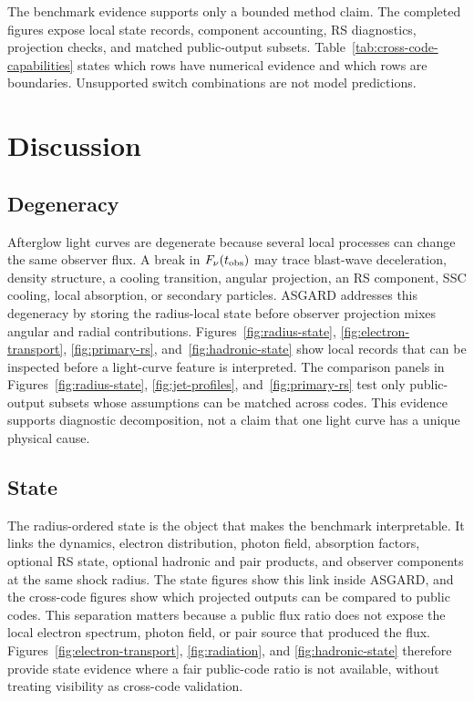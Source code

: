 \documentclass[twocolumn]{aastex702}
\begin{document}
The benchmark evidence supports only a bounded method claim.  The completed
figures expose local state records, component accounting, RS diagnostics,
projection checks, and matched public-output subsets.
Table~\ref{tab:cross-code-capabilities} states which rows have
numerical evidence and which rows are boundaries.  Unsupported switch
combinations are not model predictions.

\section{Discussion} \label{sec:discussion}

\subsection{Degeneracy}

Afterglow light curves are degenerate because several local processes can change
the same observer flux.  A break in \(F_\nu(t_{\rm obs})\) may trace blast-wave
deceleration, density structure, a cooling transition, angular projection, an RS
component, SSC cooling, local absorption, or secondary particles.  ASGARD
addresses this degeneracy by storing the radius-local state before observer
projection mixes angular and radial contributions.  Figures~\ref{fig:radius-state},
\ref{fig:electron-transport}, \ref{fig:primary-rs}, and~\ref{fig:hadronic-state}
show local records that can be inspected before a light-curve feature is
interpreted.  The comparison panels in Figures~\ref{fig:radius-state},
\ref{fig:jet-profiles}, and~\ref{fig:primary-rs} test only public-output subsets
whose assumptions can be matched across codes.
This evidence supports diagnostic decomposition, not a claim that one light curve
has a unique physical cause.

\subsection{State}

The radius-ordered state is the object that makes the benchmark interpretable.
It links the dynamics, electron distribution, photon field, absorption factors,
optional RS state, optional hadronic and pair products, and observer components
at the same shock radius.  The state figures show this link inside ASGARD, and
the cross-code figures show which projected outputs can be compared to public
codes.  This separation matters because a public flux ratio does not expose the
local electron spectrum, photon field, or pair source that produced the flux.
Figures~\ref{fig:electron-transport}, \ref{fig:radiation}, and
\ref{fig:hadronic-state} therefore provide state evidence where a fair
public-code ratio is not available, without treating visibility as cross-code
validation.
\end{document}
